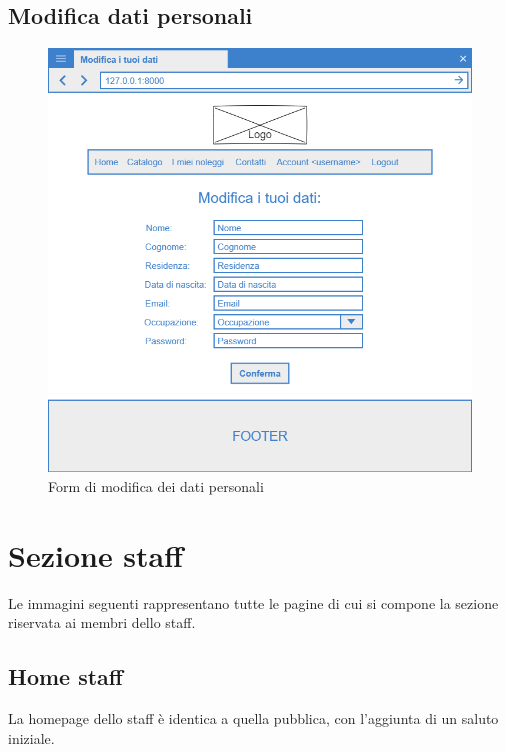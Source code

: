 \documentclass[12pt,a4paperS]{report}
\begin{document}
\begin{normalsize}
			\subsection{Modifica dati personali}
				\begin{figure}[H]
					\centering
					\includegraphics[width=1\textwidth, height=1\textheight, keepaspectratio]{Mockup/Modifica_dati.png}
					\caption{Form di modifica dei dati personali}
				\end{figure}
				
		\section{Sezione staff}
			Le immagini seguenti rappresentano tutte le pagine di cui si compone la sezione riservata ai membri dello staff.
			
			\subsection{Home staff}
				La homepage dello staff è identica a quella pubblica, con l'aggiunta di un saluto iniziale.
			

\end{normalsize}
\end{document}
